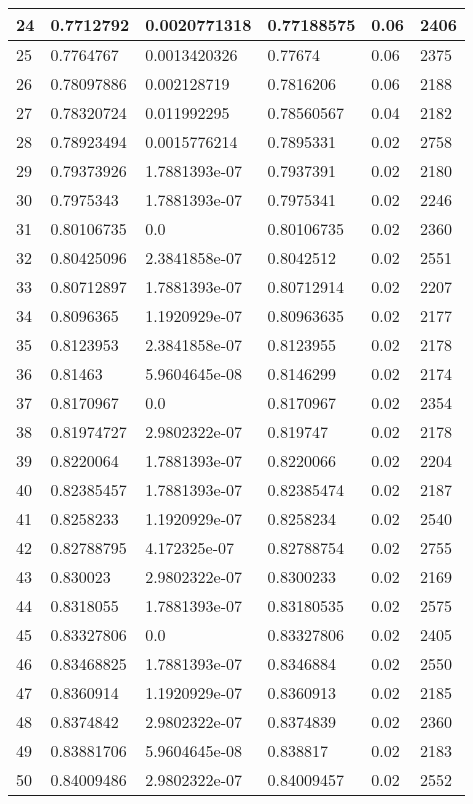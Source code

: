 \begin{longtable}{|l|l|l|l|l|l|}
24 & 0.7712792 & 0.0020771318 & 0.77188575 & 0.06 & 2406 \\ \hline 
25 & 0.7764767 & 0.0013420326 & 0.77674 & 0.06 & 2375 \\ \hline 
26 & 0.78097886 & 0.002128719 & 0.7816206 & 0.06 & 2188 \\ \hline 
27 & 0.78320724 & 0.011992295 & 0.78560567 & 0.04 & 2182 \\ \hline 
28 & 0.78923494 & 0.0015776214 & 0.7895331 & 0.02 & 2758 \\ \hline 
29 & 0.79373926 & 1.7881393e-07 & 0.7937391 & 0.02 & 2180 \\ \hline 
30 & 0.7975343 & 1.7881393e-07 & 0.7975341 & 0.02 & 2246 \\ \hline 
31 & 0.80106735 & 0.0 & 0.80106735 & 0.02 & 2360 \\ \hline 
32 & 0.80425096 & 2.3841858e-07 & 0.8042512 & 0.02 & 2551 \\ \hline 
33 & 0.80712897 & 1.7881393e-07 & 0.80712914 & 0.02 & 2207 \\ \hline 
34 & 0.8096365 & 1.1920929e-07 & 0.80963635 & 0.02 & 2177 \\ \hline 
35 & 0.8123953 & 2.3841858e-07 & 0.8123955 & 0.02 & 2178 \\ \hline 
36 & 0.81463 & 5.9604645e-08 & 0.8146299 & 0.02 & 2174 \\ \hline 
37 & 0.8170967 & 0.0 & 0.8170967 & 0.02 & 2354 \\ \hline 
38 & 0.81974727 & 2.9802322e-07 & 0.819747 & 0.02 & 2178 \\ \hline 
39 & 0.8220064 & 1.7881393e-07 & 0.8220066 & 0.02 & 2204 \\ \hline 
40 & 0.82385457 & 1.7881393e-07 & 0.82385474 & 0.02 & 2187 \\ \hline 
41 & 0.8258233 & 1.1920929e-07 & 0.8258234 & 0.02 & 2540 \\ \hline 
42 & 0.82788795 & 4.172325e-07 & 0.82788754 & 0.02 & 2755 \\ \hline 
43 & 0.830023 & 2.9802322e-07 & 0.8300233 & 0.02 & 2169 \\ \hline 
44 & 0.8318055 & 1.7881393e-07 & 0.83180535 & 0.02 & 2575 \\ \hline 
45 & 0.83327806 & 0.0 & 0.83327806 & 0.02 & 2405 \\ \hline 
46 & 0.83468825 & 1.7881393e-07 & 0.8346884 & 0.02 & 2550 \\ \hline 
47 & 0.8360914 & 1.1920929e-07 & 0.8360913 & 0.02 & 2185 \\ \hline 
48 & 0.8374842 & 2.9802322e-07 & 0.8374839 & 0.02 & 2360 \\ \hline 
49 & 0.83881706 & 5.9604645e-08 & 0.838817 & 0.02 & 2183 \\ \hline 
50 & 0.84009486 & 2.9802322e-07 & 0.84009457 & 0.02 & 2552 \\ \hline 
\end{longtable}
